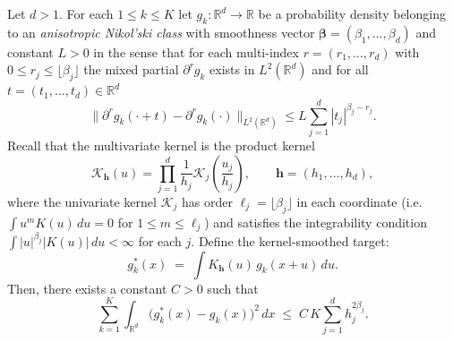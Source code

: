 \documentclass[preprint,11pt]{article}
\newcommand{\mcal}{\mathcal}
\numberwithin{equation}{section}
\begin{document}
\begin{lemma}
\label{lem:multivariate-lemma4.3}
Let $d>1$.  For each $1\le k\le K$ let $g_k:\mathbb{R}^d\to\mathbb{R}$ be a probability density belonging to an \emph{anisotropic Nikol'ski class} with smoothness vector $\boldsymbol{\beta}=(\beta_1,\dots,\beta_d)$ and constant $L>0$ in the sense that for each multi-index $r=(r_1,\dots,r_d)$ with $0\le r_j\le\lfloor\beta_j\rfloor$ the mixed partial $\partial^r g_k$ exists in $L^2(\mathbb{R}^d)$ and for all $t=(t_1,\dots,t_d)\in\mathbb{R}^d$
\[
\Big\| \partial^r g_k(\cdot + t) - \partial^r g_k(\cdot)\Big\|_{L^2(\mathbb{R}^d)}
\le L \sum_{j=1}^d |t_j|^{\beta_j - r_j} .
\]
Recall that the multivariate kernel is the product kernel
\[
\mcal{K}_{\mathbf{h}}(u) = \prod_{j=1}^d \frac{1}{h_j} \mcal{K}_j\!\left(\frac{u_j}{h_j}\right),\qquad \mathbf{h}=(h_1,\dots,h_d),
\]
where the univariate kernel $\mcal{K}_j$ has order $\ell_j=\lfloor\beta_j\rfloor$ in each coordinate (i.e.\ $\int u^m K(u)\,du=0$ for $1\le m\le \ell_j$) and satisfies the integrability condition $\int |u|^{\beta_j}|K(u)|\,du<\infty$ for each $j$. Define the kernel-smoothed target:
\[
g_k^*(x) \;=\; \int K_{\mathbf{h}}(u)\, g_k(x+u)\,du .
\]
Then, there exists a constant $C>0$ such that
\[
\sum_{k=1}^K \int_{\mathbb{R}^d} \big( g_k^*(x) - g_k(x) \big)^2 \,dx
\;\le\; C \, K \sum_{j=1}^d h_j^{2\beta_j}.
\]
\end{lemma}
\end{document}

